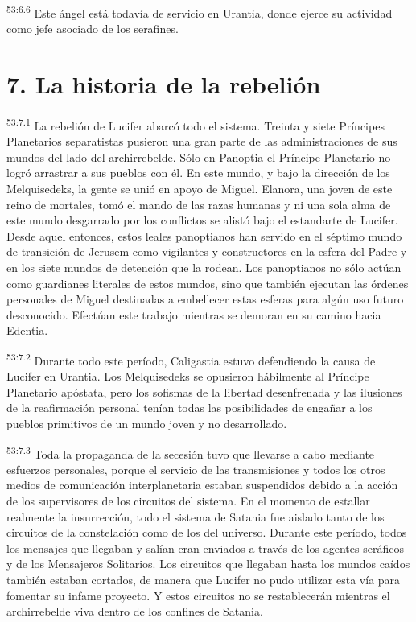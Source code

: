 \par
\textsuperscript{53:6.6} Este ángel está todavía de servicio en Urantia, donde ejerce su actividad como jefe asociado de los serafines.

\section*{7. La historia de la rebelión}
\par
\textsuperscript{53:7.1} La rebelión de Lucifer abarcó todo el sistema. Treinta y siete Príncipes Planetarios separatistas pusieron una gran parte de las administraciones de sus mundos del lado del archirrebelde. Sólo en Panoptia el Príncipe Planetario no logró arrastrar a sus pueblos con él. En este mundo, y bajo la dirección de los Melquisedeks, la gente se unió en apoyo de Miguel. Elanora, una joven de este reino de mortales, tomó el mando de las razas humanas y ni una sola alma de este mundo desgarrado por los conflictos se alistó bajo el estandarte de Lucifer. Desde aquel entonces, estos leales panoptianos han servido en el séptimo mundo de transición de Jerusem como vigilantes y constructores en la esfera del Padre y en los siete mundos de detención que la rodean. Los panoptianos no sólo actúan como guardianes literales de estos mundos, sino que también ejecutan las órdenes personales de Miguel destinadas a embellecer estas esferas para algún uso futuro desconocido. Efectúan este trabajo mientras se demoran en su camino hacia Edentia.

\par
\textsuperscript{53:7.2} Durante todo este período, Caligastia estuvo defendiendo la causa de Lucifer en Urantia. Los Melquisedeks se opusieron hábilmente al Príncipe Planetario apóstata, pero los sofismas de la libertad desenfrenada y las ilusiones de la reafirmación personal tenían todas las posibilidades de engañar a los pueblos primitivos de un mundo joven y no desarrollado.

\par
\textsuperscript{53:7.3} Toda la propaganda de la secesión tuvo que llevarse a cabo mediante esfuerzos personales, porque el servicio de las transmisiones y todos los otros medios de comunicación interplanetaria estaban suspendidos debido a la acción de los supervisores de los circuitos del sistema. En el momento de estallar realmente la insurrección, todo el sistema de Satania fue aislado tanto de los circuitos de la constelación como de los del universo. Durante este período, todos los mensajes que llegaban y salían eran enviados a través de los agentes seráficos y de los Mensajeros Solitarios. Los circuitos que llegaban hasta los mundos caídos también estaban cortados, de manera que Lucifer no pudo utilizar esta vía para fomentar su infame proyecto. Y estos circuitos no se restablecerán mientras el archirrebelde viva dentro de los confines de Satania.


